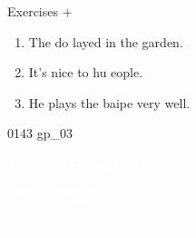 \documentclass[aspectratio=169,xcolor={dvipsnames,table}]{beamer}
\begin{document}
\begin{frame}[plain]{Exercises  $+$ }
  \Large
  \begin{enumerate}
    \item<2-> The do \hspace{-2pt} layed in the garden.
    \item<4-> It's nice to hu  eople.
    \item<6-> He plays the baipe very well.
  \end{enumerate}

  \hfill{\tiny 0143}\,{\scriptsize {}\,gp\_03}

\end{frame}
\begin{frame}
  \hypertarget{today}{}
  \centering
  \textcolor{white}{\Huge\bfseries Today's Pronunciation}

  \vspace{30pt}

  \textcolor{white}{\Large 連続する破裂音}

  \textcolor{white}{\Large {} $+$ }
\end{frame}
\end{document}
